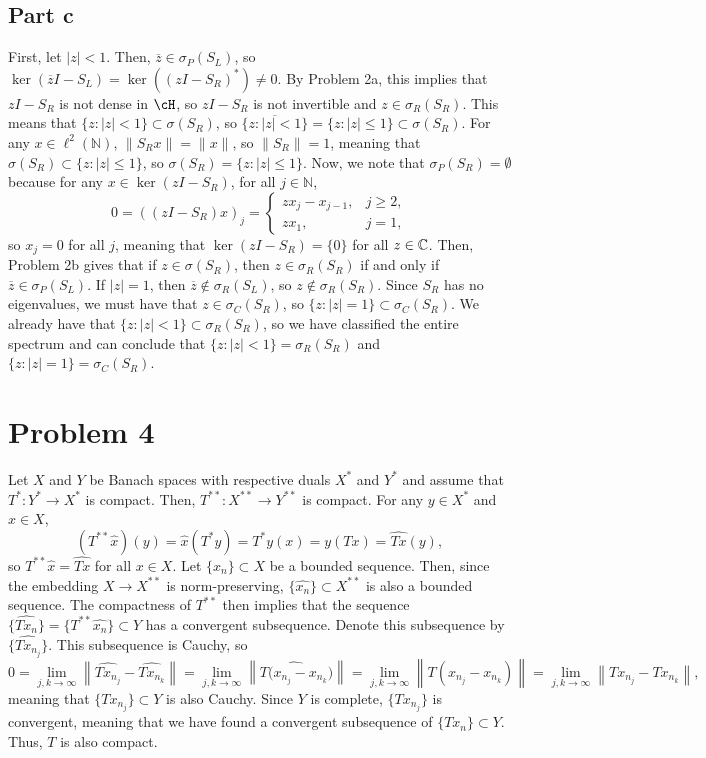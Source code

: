 \documentclass{article}
\begin{document}
\subsection{Part c}
First, let $|z|<1$. Then, $\overline z\in\sigma_P(S_L)$, so $\ker(\overline zI-S_L)=\ker\left((zI-S_R)^*\right)\neq0$. By Problem 2a, this implies that $zI-S_R$ is not dense in $\cH$, so $zI-S_R$ is not invertible and $z\in\sigma_R(S_R)$. This means that $\{z:|z|<1\}\subset\sigma(S_R)$, so $\overline{\{z:|z|<1\}}=\{z:|z|\leq1\}\subset\sigma(S_R)$. For any $x\in\ell^2(\mathbb{N})$, $\|S_Rx\|=\|x\|$, so $\|S_R\|=1$, meaning that $\sigma(S_R)\subset\{z:|z|\leq 1\}$, so $\sigma(S_R)=\{z:|z|\leq 1\}$. Now, we note that $\sigma_P(S_R)=\emptyset$ because for any $x\in\ker(zI-S_R)$, for all $j\in\mathbb{N}$,
\[
0=\left((zI-S_R)x\right)_j=\begin{cases}
	zx_j-x_{j-1},&j\geq2,\\
	zx_1,&j=1,
\end{cases}
\]
so $x_j=0$ for all $j$, meaning that $\ker(zI-S_R)=\{0\}$ for all $z\in\mathbb{C}$. Then, Problem 2b gives that if $z\in\sigma(S_R)$, then $z\in\sigma_R(S_R)$ if and only if $\overline{z}\in\sigma_P(S_L)$. If $|z|=1$, then $\overline z\notin\sigma_R(S_L)$, so $z\notin \sigma_R(S_R)$. Since $S_R$ has no eigenvalues, we must have that $z\in\sigma_C(S_R)$, so $\{z:|z|=1\}\subset\sigma_C(S_R)$. We already have that $\{z:|z|<1\}\subset\sigma_R(S_R)$, so we have classified the entire spectrum and can conclude that $\{z:|z|<1\}=\sigma_R(S_R)$ and $\{z:|z|=1\}=\sigma_C(S_R)$.

\section{Problem 4}
Let $X$ and $Y$ be Banach spaces with respective duals $X^*$ and $Y^*$ and assume that $T^*:Y^*\to X^*$ is compact. Then, $T^{**}:X^{**}\to Y^{**}$ is compact. For any $y\in X^*$ and $x\in X$,
\[
(T^{**}\hat x)(y)=\hat x(T^*y)=T^*y(x)=y(Tx)=\widehat{Tx}(y),
\]
so $T^{**}\hat x=\widehat{Tx}$ for all $x\in X$. Let $\{x_n\}\subset X$ be a bounded sequence. Then, since the embedding $X\to X^{**}$ is norm-preserving, $\{\widehat{x_n}\}\subset X^{**}$ is also a bounded sequence. The compactness of $T^{**}$ then implies that the sequence $\{\widehat{Tx_n}\}=\{T^{**}\widehat{x_n}\}\subset Y$ has a convergent subsequence. Denote this subsequence by $\{\widehat{Tx_{n_j}}\}$. This subsequence is Cauchy, so
\[
0=\lim_{j,k\to\infty}\left\|\widehat{Tx_{n_j}}-\widehat{Tx_{n_k}}\right\|=\lim_{j,k\to\infty}\left\|\widehat{T(x_{n_j}-x_{n_k}})\right\|=\lim_{j,k\to\infty}\left\|T(x_{n_j}-x_{n_k})\right\|=\lim_{j,k\to\infty}\left\|Tx_{n_j}-Tx_{n_k}\right\|,
\]
meaning that $\{Tx_{n_j}\}\subset Y$ is also Cauchy. Since $Y$ is complete, $\{Tx_{n_j}\}$ is convergent, meaning that we have found a convergent subsequence of $\{Tx_n\}\subset Y$. Thus, $T$ is also compact.
\end{document}
